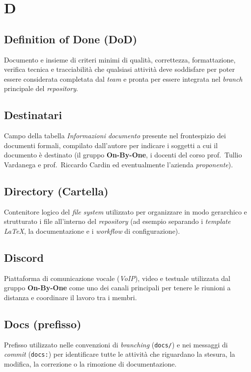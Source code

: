 \documentclass[11pt, a4paper]{article}
\begin{document}
\newpage

\section*{D}

\subsection*{Definition of Done (DoD)}
Documento e insieme di criteri minimi di qualità, correttezza, formattazione, verifica tecnica e tracciabilità che qualsiasi attività deve soddisfare per poter essere considerata completata dal \textit{team} e pronta per essere integrata nel \textit{branch} principale del \textit{repository}.

\subsection*{Destinatari}
Campo della tabella \textit{Informazioni documento} presente nel frontespizio dei documenti formali, compilato dall'autore per indicare i soggetti a cui il documento è destinato (il gruppo \textbf{On-By-One}, i docenti del corso prof.\ Tullio Vardanega e prof.\ Riccardo Cardin ed eventualmente l'azienda \textit{proponente}).

\subsection*{Directory (Cartella)}
Contenitore logico del \textit{file system} utilizzato per organizzare in modo gerarchico e strutturato i file all'interno del \textit{repository} (ad esempio separando i \textit{template} \textit{LaTeX}, la documentazione e i \textit{workflow} di configurazione).

\subsection*{Discord}
Piattaforma di comunicazione vocale (\textit{VoIP}), video e testuale utilizzata dal gruppo \textbf{On-By-One} come uno dei canali principali per tenere le riunioni a distanza e coordinare il lavoro tra i membri.

\subsection*{Docs (prefisso)}
Prefisso utilizzato nelle convenzioni di \textit{branching} (\texttt{docs/}) e nei messaggi di \textit{commit} (\texttt{docs:}) per identificare tutte le attività che riguardano la stesura, la modifica, la correzione o la rimozione di documentazione.
\end{document}
